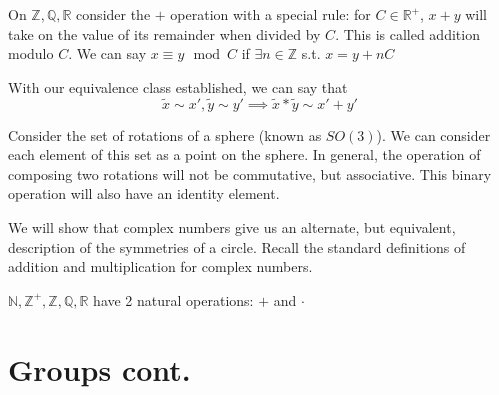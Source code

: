 \documentclass{report}
\begin{document}
\begin{example}
    On $\mathbb{Z}, \mathbb{Q}, \mathbb{R}$ consider the $+$ operation with a special rule: for $C \in \mathbb{R}^+$, $x + y$ will take on the value of its remainder when divided by $C$. This is called addition modulo $C$. We can say $x \equiv y \, \bmod C$ if $\exists n \in \mathbb{Z}$ s.t. $x = y + n C$
\end{example}

With our equivalence class established, we can say that
\begin{equation*}
    \tilde{x} \sim x', \tilde{y} \sim y' \implies \tilde{x} * \tilde{y} \sim x' + y'
\end{equation*}

\begin{example}
    Consider the set of rotations of a sphere (known as $SO(3)$). We can consider each element of this set as a point on the sphere. In general, the operation of composing two rotations will not be commutative, but associative. This binary operation will also have an identity element.
\end{example}

\begin{example}
    We will show that complex numbers give us an alternate, but equivalent, description of the symmetries of a circle. Recall the standard definitions of addition and multiplication for complex numbers. 

    \begin{remark}
        $\mathbb{N}, \mathbb{Z}^+, \mathbb{Z}, \mathbb{Q}, \mathbb{R}$ have 2 natural operations: $+$ and $\cdot$
    \end{remark}
\end{example}

\chapter{Groups cont.}
\end{document}
